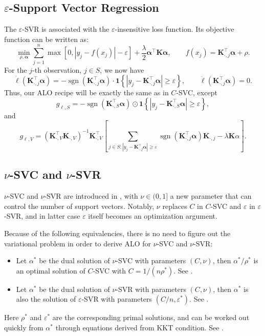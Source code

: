 \documentclass[11pt]{article}
\newcommand{\bK}{\bm{K}}
\newcommand{\balpha}{\bm{\alpha}}
\DeclareMathOperator{\sign}{sgn}
\begin{document}
\subsection{\(\varepsilon\)-Support Vector Regression}
The \(\varepsilon\)-SVR is associated with the \(\varepsilon\)-insensitive loss function. Its objective function can be written as: 
\begin{equation}
\min_{\rho,\balpha}\sum_{j=1}^{n}\max\left[0, |y_j-f(x_j)|-\varepsilon\right]+\frac{\lambda}{2}\balpha^\top\bK\balpha, \qquad f(x_j)=\bK_{\cdot,j}^\top\balpha+\rho.
\end{equation} 
For the \(j\)-th observation, \(j\in S\), we now have \[\dot{\ell}(\bK_{\cdot,j}^\top\balpha)=-\sign\left(\bK_{\cdot,j}^\top\balpha\right)\cdot\bm{1}\left\{\left|y_j-\bK_{\cdot,j}^\top\balpha\right|\geq\varepsilon\right\},\qquad\ddot{\ell}(\bK_{\cdot,j}^\top\balpha)=0.\] Thus, our ALO recipe will be exactly the same as in \(C\)-SVC, except \[g_{\ell, S}=-\sign\left(\bK_{\cdot,S}^\top\balpha\right)\odot\bm{1}\left\{\left|y_j-\bK_{\cdot,S}^\top\balpha\right|\geq\varepsilon\right\},\] and \[g_{\ell, V}=\left(\bK_{\cdot,V}^\top\bK_{\cdot,V}\right)^{-1}\bK_{\cdot,V}^\top\left[\sum_{j\in S:\left|y_j-\bK_{\cdot,j}^\top\balpha\right|\geq\varepsilon}\sign\left(\bK_{\cdot,j}^\top\balpha\right)\bK_{\cdot,j}-\lambda\bK\alpha\right].\]

\subsection{\(\nu\)-SVC and \(\nu\)-SVR}
\(\nu\)-SVC and \(\nu\)-SVR are introduced in \autocite{S2000}, with \(\nu\in(0, 1]\) a new parameter that can control the number of support vectors. Notably, \(\nu\) replaces \(C\) in \(C\)-SVC and \(\varepsilon\) in \(\varepsilon\)-SVR, and in latter case \(\varepsilon\) itself becomes an optimization argument.

Because of the following equivalencies, there is no need to figure out the variational problem in order to derive ALO for \(\nu\)-SVC and \(\nu\)-SVR:
	\begin{itemize}
	\item Let \(\alpha^\ast\) be the dual solution of \(\nu\)-SVC with parameters \((C,\nu)\), then \(\alpha^\ast/\rho^\ast\) is an optimal solution of \(C\)-SVC with \(C=1/(n\rho^\ast)\). See \autocite{CL2001}.
	\item Let \(\alpha^\ast\) be the dual solution of \(\nu\)-SVR with parameters \((C,\nu)\), then \(\alpha^\ast\) is also the solution of \(\varepsilon\)-SVR with parameters \((C/n,\varepsilon^\ast)\). See \autocite{CL2002}.
	\end{itemize}
Here \(\rho^\ast\) and \(\varepsilon^\ast\) are the corresponding primal solutions, and can be worked out quickly from \(\alpha^\ast\) through equations derived from KKT condition. See \cite[Section~4.2]{CL2011}.
\end{document}
